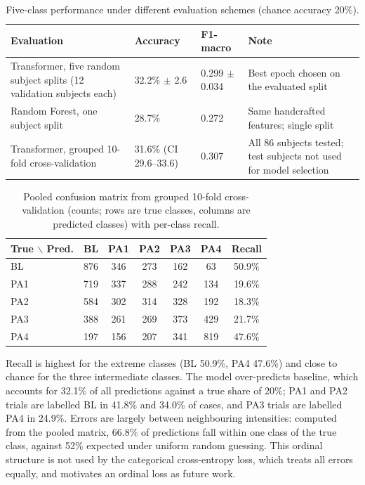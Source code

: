 \begin{table}[h]
\centering
\caption{Five-class performance under different evaluation schemes (chance accuracy 20\%).}
\label{tab:cv-summary}
\begin{tabularx}{\textwidth}{p{} p{} p{} X}
\hline
\textbf{Evaluation} & \textbf{Accuracy} & \textbf{F1-macro} & \textbf{Note} \\
\hline
Transformer, five random subject splits (12 validation subjects each) & 32.2\% $\pm$ 2.6 & 0.299 $\pm$ 0.034 & Best epoch chosen on the evaluated split \\
Random Forest, one subject split & 28.7\% & 0.272 & Same handcrafted features; single split \\
Transformer, grouped 10-fold cross-validation & 31.6\% (CI 29.6--33.6) & 0.307 & All 86 subjects tested; test subjects not used for model selection \\
\hline
\end{tabularx}
\end{table}

\begin{table}[h]
\centering
\small
\caption{Pooled confusion matrix from grouped 10-fold cross-validation (counts; rows are true classes, columns are predicted classes) with per-class recall.}
\label{tab:cv-confusion}
\begin{tabular}{lccccc c}
\hline
\textbf{True} $\backslash$ \textbf{Pred.} & BL & PA1 & PA2 & PA3 & PA4 & Recall \\
\hline
BL & 876 & 346 & 273 & 162 & 63 & 50.9\% \\
PA1 & 719 & 337 & 288 & 242 & 134 & 19.6\% \\
PA2 & 584 & 302 & 314 & 328 & 192 & 18.3\% \\
PA3 & 388 & 261 & 269 & 373 & 429 & 21.7\% \\
PA4 & 197 & 156 & 207 & 341 & 819 & 47.6\% \\
\hline
\end{tabular}
\end{table}

Recall is highest for the extreme classes (BL 50.9\%, PA4 47.6\%) and close to chance for the three intermediate classes. The model over-predicts baseline, which accounts for 32.1\% of all predictions against a true share of 20\%; PA1 and PA2 trials are labelled BL in 41.8\% and 34.0\% of cases, and PA3 trials are labelled PA4 in 24.9\%. Errors are largely between neighbouring intensities: computed from the pooled matrix, 66.8\% of predictions fall within one class of the true class, against 52\% expected under uniform random guessing. This ordinal structure is not used by the categorical cross-entropy loss, which treats all errors equally, and motivates an ordinal loss as future work.


